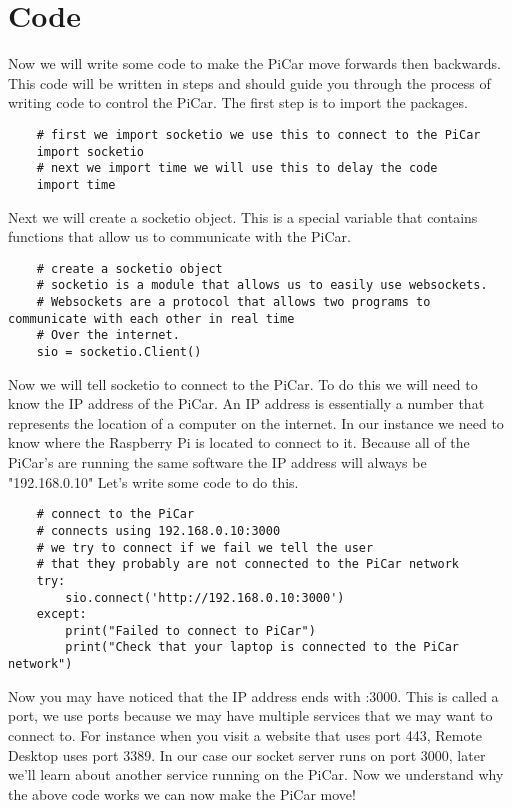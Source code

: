 \documentclass[11pt]{report}
\begin{document}
    \section{Code}
    Now we will write some code to make the PiCar move forwards then backwards. 
    This code will be written in steps and should guide you through the process of writing code to control the PiCar. The first step is to import the packages.
    \begin{verbatim}
    # first we import socketio we use this to connect to the PiCar
    import socketio 
    # next we import time we will use this to delay the code
    import time
    \end{verbatim}

    Next we will create a socketio object. This is a special variable that contains functions that allow us to communicate with the PiCar.

    \begin{verbatim}
    # create a socketio object
    # socketio is a module that allows us to easily use websockets.
    # Websockets are a protocol that allows two programs to communicate with each other in real time
    # Over the internet. 
    sio = socketio.Client()
    \end{verbatim}

    Now we will tell socketio to connect to the PiCar. To do this we will need to know the IP address of the PiCar. An IP address is essentially a number that represents the location of a computer on the internet. In our instance we need to know where the Raspberry Pi is located to connect to it. Because all of the PiCar's are running the same software the IP address will always be "192.168.0.10" Let's write some code to do this.

    \begin{verbatim}
    # connect to the PiCar
    # connects using 192.168.0.10:3000
    # we try to connect if we fail we tell the user 
    # that they probably are not connected to the PiCar network
    try:
        sio.connect('http://192.168.0.10:3000')
    except:
        print("Failed to connect to PiCar")
        print("Check that your laptop is connected to the PiCar network")
    \end{verbatim}

    Now you may have noticed that the IP address ends with :3000. This is called a port, we use ports because we may have multiple services that we may want to connect to. For instance when you visit a website that uses port 443, Remote Desktop uses port 3389. In our case our socket server runs on port 3000, later we'll learn about another service running on the PiCar. Now we understand why the above code works we can now make the PiCar move!
\end{document}
